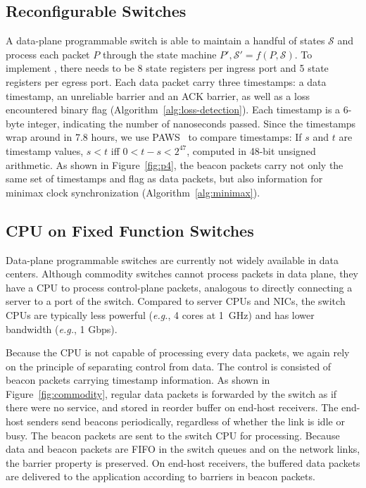 \subsection{Reconfigurable Switches}
\label{sec:p4}

A data-plane programmable switch is able to maintain a handful of states $\mathcal{S}$ and process each packet $P$ through the state machine $P', \mathcal{S}' = f(P, \mathcal{S})$.
To implement \sys, there needs to be 8 state registers per ingress port and 5 state registers per egress port.
Each data packet carry three timestamps: a data timestamp, an unreliable barrier and an ACK barrier, as well as a loss encountered binary flag (Algorithm~\ref{alg:loss-detection}).
Each timestamp is a 6-byte integer, indicating the number of nanoseconds passed.
Since the timestamps wrap around in 7.8 hours, we use PAWS~\cite{jacobson1992tcp} to compare timestamps: If $s$ and $t$ are timestamp values, $s < t$ iff $0 < t - s < 2^{47}$, computed in 48-bit unsigned arithmetic.
As shown in Figure~\ref{fig:p4}, the beacon packets carry not only the same set of timestamps and flag as data packets, but also information for minimax clock synchronization (Algorithm~\ref{alg:minimax}).

\subsection{CPU on Fixed Function Switches}
\label{sec:commodity}

Data-plane programmable switches are currently not widely available in data centers.
Although commodity switches cannot process packets in data plane, they have a CPU to process control-plane packets, analogous to directly connecting a server to a port of the switch.
Compared to server CPUs and NICs, the switch CPUs are typically less powerful (\textit{e.g.}, 4 cores at 1~GHz) and has lower bandwidth (\textit{e.g.}, 1 Gbps).

Because the CPU is not capable of processing every data packets, we again rely on the principle of separating control from data.
The control is consisted of beacon packets carrying timestamp information.
As shown in Figure~\ref{fig:commodity}, regular data packets is forwarded by the switch as if there were no \sys service, and stored in reorder buffer on end-host receivers.
The end-host senders send beacons periodically, regardless of whether the link is idle or busy.
The beacon packets are sent to the switch CPU for processing.
Because data and beacon packets are FIFO in the switch queues and on the network links, the barrier property is preserved.
On end-host receivers, the buffered data packets are delivered to the application according to barriers in beacon packets.

